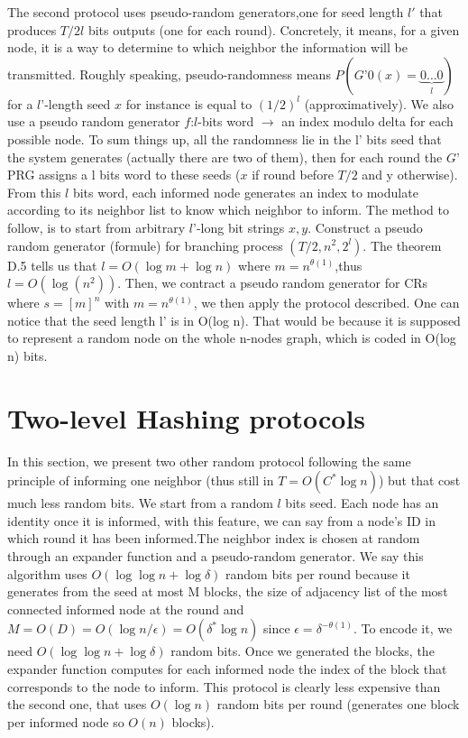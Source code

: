 \documentclass[10pt,journal,a4paper]{IEEEtran}
\begin{document}
The second protocol uses pseudo-random generators,one for seed length $l'$ that produces $T/2 l$ bits outputs (one for each round). Concretely, it means, for a given node, it is a way to determine to which neighbor the information will be transmitted. Roughly speaking, pseudo-randomness means $P(G’0(x)=\underbrace{0\dots0}_l)$ for a $l’$-length seed $x$ for instance is equal to $(1/2)^l$ (approximatively). We also use a pseudo random generator $f$:$l$-bits word $\to$ an index modulo delta for each possible node. To sum things up, all the randomness lie in the l’ bits seed that the system generates (actually there are two of them), then for each round the $G’$ PRG assigns a l bits word to these seeds ($x$ if round before $T/2$ and y otherwise). From this $l$ bits word, each informed node generates an index to modulate according to its neighbor list to know which neighbor to inform.
 The method to follow, is to start from arbitrary $l’$-long bit strings $x,y$. Construct a pseudo random generator (formule) for branching process $(T/2,n^2,2^l)$. The theorem D.5 tells us that $l=O(\log m+\log n)$ where $m=n^{\theta(1)}$,thus $l=O(\log(n^2))$. Then, we contract a pseudo random generator for CRs where $s=[m]^n$ with $m=n^{\theta(1)}$, we then apply the protocol described.
   One can notice that the seed length l’ is in O(log n). That would be because it is supposed to represent a random node on the whole n-nodes graph, which is coded in O(log n) bits.

 \section{Two-level Hashing protocols}
 
 In this section, we present two other random protocol following the same principle of informing one neighbor (thus still in $T=O(C^*\log n)$) but that cost much less random bits. We start from a random $l$ bits seed. Each node has an identity once it is informed, with this feature, we can say from a node's ID in which round it has been informed.The neighbor index is chosen at random through an expander function and a pseudo-random generator. We say this algorithm uses $O(\log\log n + \log \delta)$ random bits per round because it generates from the seed at most M blocks, the size of adjacency list of the most connected informed node at the round and $M=O(D)=O(\log n / \epsilon)=O(\delta^*\log n)$ since $\epsilon=\delta^{-\theta(1)}$. To encode it, we need $O(\log\log n + \log \delta)$ random bits. Once we generated the blocks, the expander function computes for each informed node the index of the block that corresponds to the node to inform. This protocol is clearly less expensive than the second one, that uses $O(\log n)$ random bits per round (generates one block per informed node so $O(n)$ blocks).
 
\end{document}
